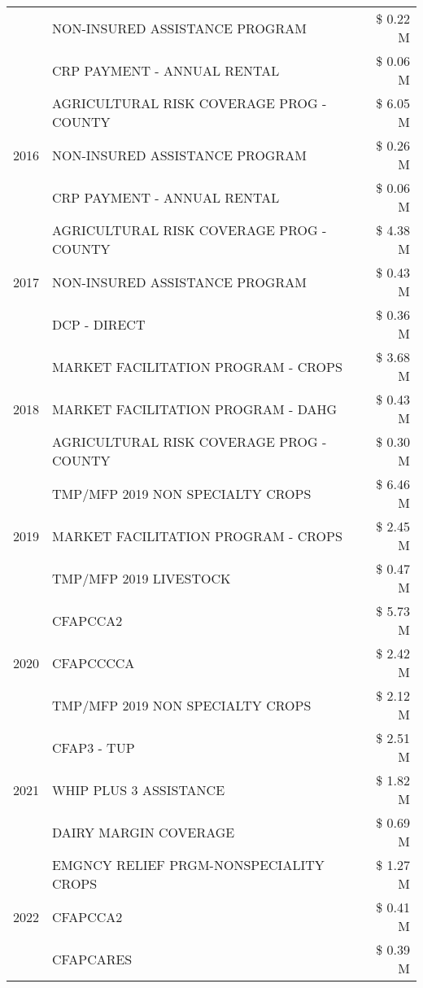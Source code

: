 \begin{tabular}{llr}
 & NON-INSURED ASSISTANCE PROGRAM & \$ 0.22 M \\
 & CRP PAYMENT - ANNUAL RENTAL & \$ 0.06 M \\
\cline{1-3}
\multirow[t]{3}{*}{2016} & AGRICULTURAL RISK COVERAGE PROG - COUNTY & \$ 6.05 M \\
 & NON-INSURED ASSISTANCE PROGRAM & \$ 0.26 M \\
 & CRP PAYMENT - ANNUAL RENTAL & \$ 0.06 M \\
\cline{1-3}
\multirow[t]{3}{*}{2017} & AGRICULTURAL RISK COVERAGE PROG - COUNTY & \$ 4.38 M \\
 & NON-INSURED ASSISTANCE PROGRAM & \$ 0.43 M \\
 & DCP - DIRECT & \$ 0.36 M \\
\cline{1-3}
\multirow[t]{3}{*}{2018} & MARKET FACILITATION PROGRAM - CROPS & \$ 3.68 M \\
 & MARKET FACILITATION PROGRAM - DAHG & \$ 0.43 M \\
 & AGRICULTURAL RISK COVERAGE PROG - COUNTY & \$ 0.30 M \\
\cline{1-3}
\multirow[t]{3}{*}{2019} & TMP/MFP 2019 NON SPECIALTY CROPS & \$ 6.46 M \\
 & MARKET FACILITATION PROGRAM - CROPS & \$ 2.45 M \\
 & TMP/MFP 2019 LIVESTOCK & \$ 0.47 M \\
\cline{1-3}
\multirow[t]{3}{*}{2020} & CFAPCCA2 & \$ 5.73 M \\
 & CFAPCCCCA & \$ 2.42 M \\
 & TMP/MFP 2019 NON SPECIALTY CROPS & \$ 2.12 M \\
\cline{1-3}
\multirow[t]{3}{*}{2021} & CFAP3 - TUP & \$ 2.51 M \\
 & WHIP PLUS 3 ASSISTANCE & \$ 1.82 M \\
 & DAIRY MARGIN COVERAGE & \$ 0.69 M \\
\cline{1-3}
\multirow[t]{3}{*}{2022} & EMGNCY RELIEF PRGM-NONSPECIALITY CROPS & \$ 1.27 M \\
 & CFAPCCA2 & \$ 0.41 M \\
 & CFAPCARES & \$ 0.39 M \\
\cline{1-3}
\bottomrule
\end{tabular}
